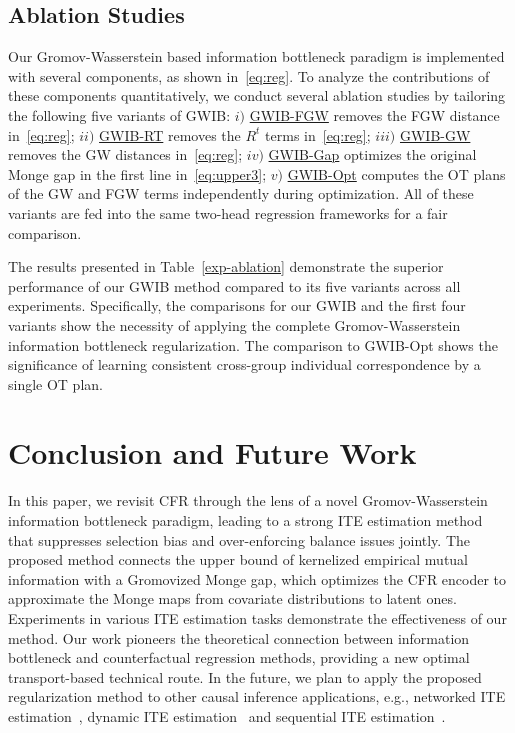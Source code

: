 \documentclass{article}
\begin{document}
\subsection{Ablation Studies}
Our Gromov-Wasserstein based information bottleneck paradigm is implemented with several components, as shown in~\eqref{eq:reg}. 
To analyze the contributions of these components quantitatively, we conduct several ablation studies by tailoring the following five variants of GWIB: 
$i)$ \underline{GWIB-FGW} removes the FGW distance in~\eqref{eq:reg}; 
$ii)$ \underline{GWIB-RT} removes the $R^t$ terms in~\eqref{eq:reg};
$iii)$ \underline{GWIB-GW} removes the GW distances in~\eqref{eq:reg};
$iv)$ \underline{GWIB-Gap} optimizes the original Monge gap in the first line in~\eqref{eq:upper3};
$v)$ \underline{GWIB-Opt} computes the OT plans of the GW and FGW terms independently during optimization.
All of these variants are fed into the same two-head regression frameworks for a fair comparison.

The results presented in Table~\ref{exp-ablation} demonstrate the superior performance of our GWIB method compared to its five variants across all experiments. 
Specifically, the comparisons for our GWIB and the first four variants show the necessity of applying the complete Gromov-Wasserstein information bottleneck regularization.
The comparison to GWIB-Opt shows the significance of learning consistent cross-group individual correspondence by a single OT plan.



\section{Conclusion and Future Work}
In this paper, we revisit CFR through the lens of a novel Gromov-Wasserstein information bottleneck paradigm, leading to a strong ITE estimation method that suppresses selection bias and over-enforcing balance issues jointly.
The proposed method connects the upper bound of kernelized empirical mutual information with a Gromovized Monge gap, which optimizes the CFR encoder to approximate the Monge maps from covariate distributions to latent ones.
Experiments in various ITE estimation tasks demonstrate the effectiveness of our method. 
Our work pioneers the theoretical connection between information bottleneck and counterfactual regression methods, providing a new optimal transport-based technical route.
In the future, we plan to apply the proposed regularization method to other causal inference applications, e.g., networked ITE estimation~\cite{guo2020learning}, dynamic ITE estimation~\cite{ma2021deconfounding} and sequential ITE estimation~\cite{bica2020estimating}.
\end{document}

